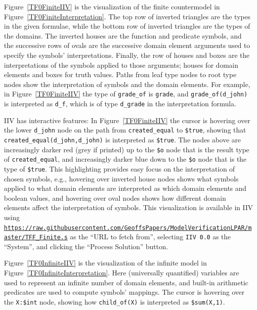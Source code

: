 \documentclass{easychair}
\newcommand{\smalltt}[1]{\small \texttt{#1}}
\begin{document}
Figure~\ref{TF0FiniteIIV} is the visualization of the finite countermodel in 
Figure~\ref{TF0FiniteInterpretation}.
The top row of inverted triangles are the types in the given formulae,
while the bottom row of inverted triangles are the types of the domains.
The inverted houses are the function and predicate symbols, and the successive rows of ovals are 
the successive domain element arguments used to specify the symbols' interpretations.
Finally, the row of houses and boxes are the interpretations of the symbols applied to those
arguments; houses for domain elements and boxes for truth values.
Paths from leaf type nodes to root type nodes show the interpretation of symbols and the domain
elements.
For example, in Figure~\ref{TF0FiniteIIV} the type of {\smalltt{grade\_of}} is {\smalltt{grade}},
and {\smalltt{grade\_of(d\_john)}} is interpreted as {\smalltt{d\_f}}, which is of type
{\smalltt{d\_grade}} in the interpretation formula.

IIV has interactive features: In Figure~\ref{TF0FiniteIIV} the cursor is hovering over 
the lower {\smalltt{d\_john}} node on the path from {\smalltt{created\_equal}} to 
{\smalltt{\$true}}, showing that {\smalltt{created\_equal(d\_john,d\_john)}} is interpreted as 
{\smalltt{\$true}}.
The nodes above are increasingly darker red (grey if printed) up to the {\smalltt{\$o}} node
that is the result type of {\smalltt{created\_equal}}, and increasingly darker blue down to 
the {\smalltt{\$o}} node that is the type of {\smalltt{\$true}}.
This highlighting provides easy focus on the interpretation of chosen symbols, e.g., hovering
over inverted house nodes shows what symbols applied to what domain elements are interpreted as 
which domain elements and boolean values, and hovering over oval nodes shows how different domain 
elements affect the interpretation of symbols.
This visualization is available in IIV using 
{\smalltt{\url{https://raw.githubusercontent.com/GeoffsPapers/ModelVerificationLPAR/master/TFF_Finite.s}}}
as the ``URL to fetch from'',
selecting {\tt IIV 0.0} as the ``System'', and clicking the ``Process Solution'' button.

Figure~\ref{TF0InfiniteIIV} is the visualization of the infinite model in 
Figure~\ref{TF0InfiniteInterpretation}. 
Here (universally quantified) variables are used to represent an infinite number of
domain elements, and built-in arithmetic predicates are used to compute symbols' mappings.
The cursor is hovering over the {\smalltt{X:\$int}} node, showing how 
{\smalltt{child\_of(X)}} is interpreted as {\smalltt{\$sum(X,1)}}.
\end{document}
